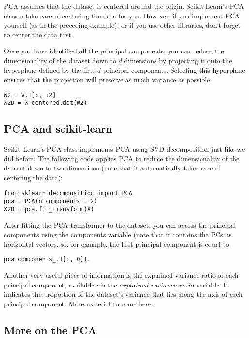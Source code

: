\documentclass[%
oneside,                 %
final,                   %
10pt]{article}
\begin{document}
PCA assumes that the dataset is centered around the origin. Scikit-Learn’s PCA classes take care of centering
the data for you. However, if you implement PCA yourself (as in the preceding example), or if you use other libraries, don’t
forget to center the data first.

Once you have identified all the principal components, you can reduce the dimensionality of the dataset
down to $d$ dimensions by projecting it onto the hyperplane defined by the first $d$ principal components.
Selecting this hyperplane ensures that the projection will preserve as much variance as possible. 
\begin{verbatim}
W2 = V.T[:, :2]
X2D = X_centered.dot(W2)
\end{verbatim}

\subsection*{PCA and scikit-learn}

Scikit-Learn’s PCA class implements PCA using SVD decomposition just like we did before. The
following code applies PCA to reduce the dimensionality of the dataset down to two dimensions (note
that it automatically takes care of centering the data):
\begin{verbatim}
from sklearn.decomposition import PCA
pca = PCA(n_components = 2)
X2D = pca.fit_transform(X)
\end{verbatim}
After fitting the PCA transformer to the dataset, you can access the principal components using the
components variable (note that it contains the PCs as horizontal vectors, so, for example, the first
principal component is equal to 
\begin{verbatim}
pca.components_.T[:, 0]).
\end{verbatim}
Another very useful piece of information is the explained variance ratio of each principal component,
available via the $explained\_variance\_ratio$ variable. It indicates the proportion of the dataset’s
variance that lies along the axis of each principal component. 
More material to come here.

\subsection*{More on the PCA}
\end{document}
